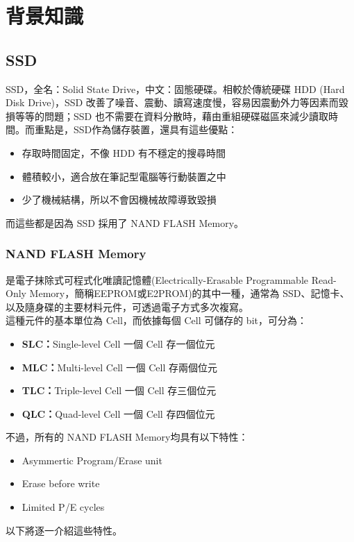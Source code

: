 \chapter{背景知識}

\section{SSD}\label{s2.1}
\indent
SSD，全名：Solid State Drive，中文：固態硬碟。相較於傳統硬碟 HDD (Hard Disk Drive)，SSD 改善了噪音、震動、讀寫速度慢，容易因震動外力等因素而毀損等等的問題；SSD 也不需要在資料分散時，藉由重組硬碟磁區來減少讀取時間。而重點是，SSD作為儲存裝置，還具有這些優點：\cite{SSD}
\begin{itemize}
    \item 存取時間固定，不像 HDD 有不穩定的搜尋時間
    \item 體積較小，適合放在筆記型電腦等行動裝置之中
    \item 少了機械結構，所以不會因機械故障導致毀損
\end{itemize}

而這些都是因為 SSD 採用了 NAND FLASH Memory。\cite{SSDFANS}

\subsection{NAND FLASH Memory}\label{s2.1.1}
\indent
是電子抹除式可程式化唯讀記憶體(Electrically-Erasable Programmable Read-Only Memory，簡稱EEPROM或E2PROM)的其中一種，通常為 SSD、記憶卡、以及隨身碟的主要材料元件，可透過電子方式多次複寫。\\
這種元件的基本單位為 Cell，而依據每個 Cell 可儲存的 bit，可分為：\cite{2014xv}
\begin{itemize}
    \item \textbf{SLC：}Single-level Cell   一個 Cell 存一個位元
    \item \textbf{MLC：}Multi-level Cell    一個 Cell 存兩個位元
    \item \textbf{TLC：}Triple-level Cell   一個 Cell 存三個位元
    \item \textbf{QLC：}Quad-level Cell     一個 Cell 存四個位元
\end{itemize}
不過，所有的 NAND FLASH Memory均具有以下特性：
\begin{itemize}
    \item Asymmertic Program/Erase unit
    \item Erase before write
    \item Limited P/E cycles
\end{itemize}
以下將逐一介紹這些特性。

